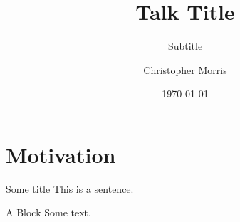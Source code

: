 \documentclass[10pt,xcolor=dvipsnames]{beamer}
\title{Talk Title}
\subtitle{Subtitle}
\date{\today}
\author{Christopher Morris}
\institute{TU Dortmund University, Germany}
\begin{document}
\maketitle

\section{Motivation}
\begin{frame}[fragile]{Some title}
	This is a sentence.
\begin{block}{A Block}
	Some text.
\end{block}
\end{frame}
\end{document}
